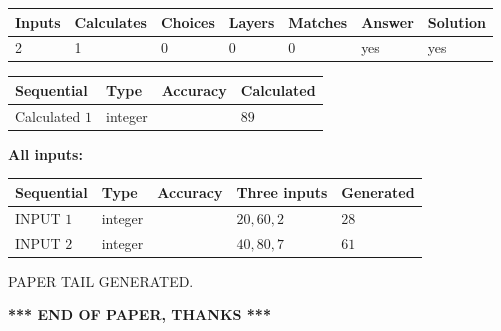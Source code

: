\documentclass[12pt]{article}
\begin{document}
   
   
   
\noindent\begin{tabular}{|l|l|l|l|l|l|l|}
 \hline
Inputs & Calculates & Choices & Layers & Matches & Answer & Solution \\ \hline
 2  & 
 1  & 
 0
  & 
 0  & 
 0  & 
  yes & 
  yes 
  \\ \hline
 \end{tabular}
   
   
   
   
\noindent{}
   
   
  
  
\noindent\begin{tabular}{|l|l|l|l|}
\hline
 Sequential & Type & Accuracy & Calculated \\ 
\hline
 
 
  Calculated $  1 $ & integer &  & 
  $ 89 $ 
 \\  \hline  
 \end{tabular}
   
   
   
   
\noindent\vspace{0.1in}\hspace{-0.08in} {\textbf{\Large{All inputs: }}}
   
   
  
  
\noindent\begin{tabular}{|l|l|l|l|l|}
\hline
 Sequential & Type & Accuracy & Three inputs & Generated \\ 
\hline
 
 
  INPUT $  1 $ & integer &  & $
 20
 , 
 60
 , 
 2
 $ & $ 28 $ 
 \\  \hline  
 
 
  INPUT $  2 $ & integer &  & $
 40
 , 
 80
 , 
 7
 $ & $ 61 $ 
 \\  \hline  
 \end{tabular}
   
   
   
   
   
   
 \vspace{0.2in}
 
   
   
\vspace{2.0in} PAPER TAIL GENERATED.
   
   
   
   
\vspace{1.0in} 
{\textbf{\large{ *** END OF PAPER, THANKS *** }}} 
   
\end{document}

